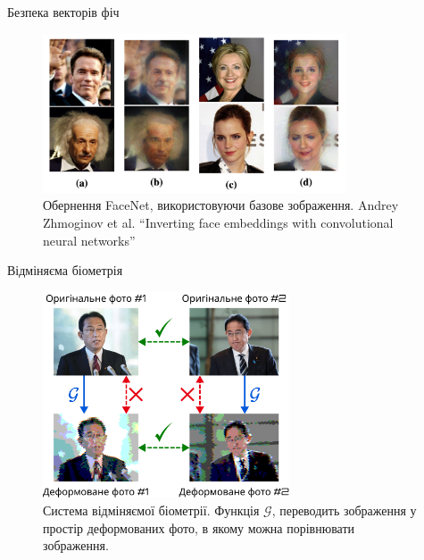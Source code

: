 \documentclass[xcolor={usenames,dvipsnames}]{beamer}
\begin{document}
    \begin{frame}{Безпека векторів фіч}
        \begin{figure}
        \centering
            \includegraphics[width=0.8\textwidth]{images/invert_emb.png}
            \caption{Обернення FaceNet, використовуючи базове зображення. Andrey Zhmoginov et al. ``Inverting face embeddings with convolutional neural networks''}
        \end{figure}
    \end{frame}

    \begin{frame}{Відміняєма біометрія}
        \begin{figure}
        \centering
            \includegraphics[width=0.65\textwidth]{images/cancelable_biometrics.png}
            \caption{Система відміняємої біометрії. Функція $\mathcal{G}$, переводить зображення у простір деформованих фото, в якому можна порівнювати зображення.}
        \end{figure}
    \end{frame}
\end{document}
